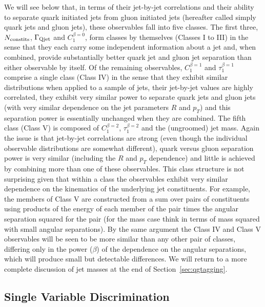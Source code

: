 We will see below that, in terms of their jet-by-jet correlations and their ability to separate quark initiated jets from gluon initiated
jets (hereafter called simply quark jets and gluon jets), these observables fall into five classes.  The first three, $N_{\rm constits}$, 
$\Gamma_{\rm Qjet}$ and $C_1^{\beta=0}$, form classes by themselves (Classes I to III) in the sense that they each carry some independent information 
about a jet and, when combined, provide substantially better quark jet and gluon jet separation than either observable by itself.  Of the remaining
observables, $C_1^{\beta=1}$ and $\tau_1^{\beta=1}$ comprise a single class (Class IV) in the sense that they exhibit similar 
distributions when applied to a sample of jets, their jet-by-jet values are highly correlated, they exhibit very similar power to separate 
quark jets and gluon jets (with very similar dependence on the jet parameters $R$ and $p_T$) and this separation power is essentially unchanged
when they are combined.  The fifth class (Class V) is composed of $C_1^{\beta=2}$, $\tau_1^{\beta=2}$ and the (ungroomed) jet mass.  Again the issue is that
jet-by-jet correlations are strong (even though the individual observable distributions are somewhat different), quark versus gluon separation power is very similar
(including the $R$ and $p_T$ dependence) and little is achieved by combining more than one of these observables.  This class structure is
not surprising given that within a class the observables exhibit very similar dependence on the kinematics of the underlying jet constituents.     
For example, the members of Class V are constructed from a sum over pairs of constituents using products of the energy of each member 
of the pair times the angular separation squared for the pair (for the mass case think in terms of mass squared with small angular separations).  
By the same argument the Class IV and Class V observables will be seen to be more similar than any other pair of classes, differing only in the
power ($\beta$) of the dependence on the angular separations, which will produce small but detectable differences.  We will return to
 a more complete discussion of jet masses at the end of Section~\ref{sec:qgtagging}.


\subsection{Single Variable Discrimination}


